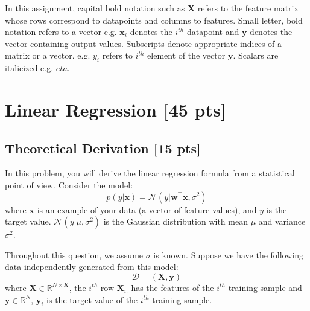 \documentclass[a4paper]{article}
\theoremstyle{definition}
\def\x{\mathbf x}
\def\y{\mathbf y}
\def\w{\mathbf w}
\begin{document}
\vspace{0.2in}

In this assignment, capital bold notation such as $\mathbf{X}$ refers to the feature matrix whose rows correspond to datapoints and columns to features. Small letter, bold notation refers to a vector e.g. $\x_i$ denotes the $i^{th}$ datapoint and $\y$ denotes the vector containing output values. Subscripts denote appropriate indices of a matrix or a vector. e.g. $y_i$ refers to $i^{th}$ element of the vector $\y$. Scalars are italicized e.g. $eta$.

\section{Linear Regression [45 pts]}

\subsection{Theoretical Derivation [15 pts]}

In this problem, you will derive the linear regression formula from a statistical point of view. Consider the model:
$$p(y|\x) = \mathcal{N}(y|\w^\top\x,\sigma^2)$$ where $\x$ is an example of your data (a vector of feature values), and $y$ is the target value.
$\mathcal{N}(y|\mu,\sigma^2)$ is the Gaussian distribution with mean $\mu$ and variance $\sigma^2$.

Throughout this question, we assume $\sigma$ is known.
Suppose we have the following data independently generated from this model: $$\mathcal{D} = (\mathbf{X},\mathbf{y})$$ where $\mathbf{X} \in \mathbb{R}^{N \times K}$, the $i^{th}$ row $\mathbf{X}_{i.}$ has the features of the $i^{th}$ training sample and $\y \in \mathbb{R}^N$, $\y_i$ is the target value of the $i^{th}$ training sample. 
\end{document}
